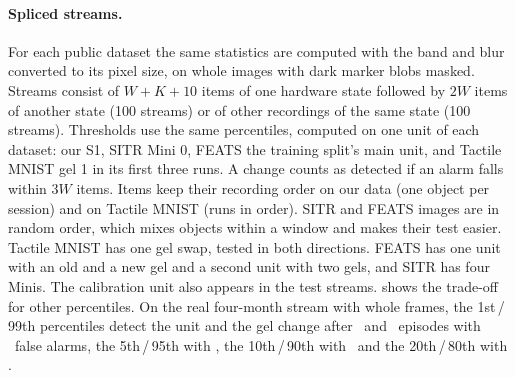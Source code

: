 \documentclass[10pt,twocolumn,letterpaper]{article}
\begin{document}
\paragraph{Spliced streams.} For each public dataset the same statistics are computed with the band and blur converted to its pixel size, on whole images with dark marker blobs masked. Streams consist of $W+K+10$ items of one hardware state followed by $2W$ items of another state (100 streams) or of other recordings of the same state (100 streams). Thresholds use the same percentiles, computed on one unit of each dataset: our S1, SITR Mini 0, FEATS the training split's main unit, and Tactile MNIST gel 1 in its first three runs. A change counts as detected if an alarm falls within $3W$ items. Items keep their recording order on our data (one object per session) and on Tactile MNIST (runs in order). SITR and FEATS images are in random order, which mixes objects within a window and makes their test easier. Tactile MNIST has one gel swap, tested in both directions. FEATS has one unit with an old and a new gel and a second unit with two gels, and SITR has four Minis. The calibration unit also appears in the test streams.  shows the trade-off for other percentiles. On the real four-month stream with whole frames, the 1st\,/\,99th percentiles detect the unit and the gel change after \FrSweepOneUnit\ and \FrSweepOneGel\ episodes with \FrSweepOneFalse\ false alarms, the 5th\,/\,95th with \FrSweepFiveFalse, the 10th\,/\,90th with \FrSweepTenFalse\ and the 20th\,/\,80th with \FrSweepTwentyFalse.
\end{document}
